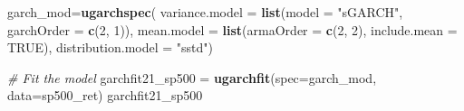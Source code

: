 \documentclass[]{article}
\newenvironment{Shaded}{\begin{snugshade}}{\end{snugshade}}
\newcommand{\KeywordTok}[1]{\textcolor[rgb]{0.13,0.29,0.53}{\textbf{#1}}}
\newcommand{\DataTypeTok}[1]{\textcolor[rgb]{0.13,0.29,0.53}{#1}}
\newcommand{\DecValTok}[1]{\textcolor[rgb]{0.00,0.00,0.81}{#1}}
\newcommand{\StringTok}[1]{\textcolor[rgb]{0.31,0.60,0.02}{#1}}
\newcommand{\CommentTok}[1]{\textcolor[rgb]{0.56,0.35,0.01}{\textit{#1}}}
\newcommand{\OtherTok}[1]{\textcolor[rgb]{0.56,0.35,0.01}{#1}}
\newcommand{\NormalTok}[1]{#1}
\begin{document}
\begin{Shaded}
\begin{Highlighting}[]
\NormalTok{garch_mod=}\KeywordTok{ugarchspec}\NormalTok{(}
  \DataTypeTok{variance.model =} \KeywordTok{list}\NormalTok{(}\DataTypeTok{model =} \StringTok{"sGARCH"}\NormalTok{, }\DataTypeTok{garchOrder =} \KeywordTok{c}\NormalTok{(}\DecValTok{2}\NormalTok{, }\DecValTok{1}\NormalTok{)),}
  \DataTypeTok{mean.model =} \KeywordTok{list}\NormalTok{(}\DataTypeTok{armaOrder =} \KeywordTok{c}\NormalTok{(}\DecValTok{2}\NormalTok{, }\DecValTok{2}\NormalTok{), }\DataTypeTok{include.mean =} \OtherTok{TRUE}\NormalTok{),}
  \DataTypeTok{distribution.model =} \StringTok{"sstd"}\NormalTok{)}

\CommentTok{# Fit the model}
\NormalTok{garchfit21_sp500 =}\StringTok{ }\KeywordTok{ugarchfit}\NormalTok{(}\DataTypeTok{spec=}\NormalTok{garch_mod, }\DataTypeTok{data=}\NormalTok{sp500_ret)}
\NormalTok{garchfit21_sp500}
\end{Highlighting}
\end{Shaded}
\end{document}
